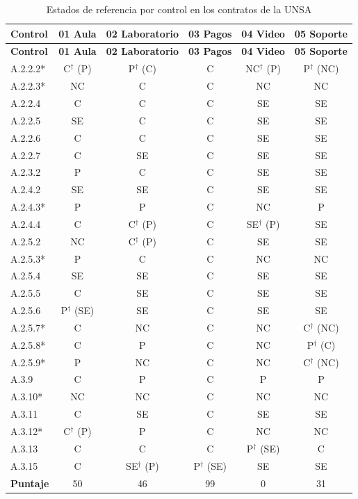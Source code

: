 \documentclass[12pt,letterpaper]{article}
\begin{document}
\begin{small}
\begin{longtable}{@{}l c c c c c@{}}
\caption{Estados de referencia por control en los contratos de la UNSA}\label{tab:unsa-matriz}\\
\toprule
\textbf{Control} & \textbf{01 Aula} & \textbf{02 Laboratorio} & \textbf{03 Pagos} & \textbf{04 Video} & \textbf{05 Soporte} \\
\midrule
\endfirsthead
\toprule
\textbf{Control} & \textbf{01 Aula} & \textbf{02 Laboratorio} & \textbf{03 Pagos} & \textbf{04 Video} & \textbf{05 Soporte} \\
\midrule
\endhead
\bottomrule
\endfoot
A.2.2.2* & C$^\dagger$ (P) & P$^\dagger$ (C) & C & NC$^\dagger$ (P) & P$^\dagger$ (NC) \\
A.2.2.3* & NC & C & C & NC & NC \\
A.2.2.4 & C & C & C & SE & SE \\
A.2.2.5 & SE & C & C & SE & SE \\
A.2.2.6 & C & C & C & SE & SE \\
A.2.2.7 & C & SE & C & SE & SE \\
A.2.3.2 & P & C & C & SE & SE \\
A.2.4.2 & SE & SE & C & SE & SE \\
A.2.4.3* & P & P & C & NC & P \\
A.2.4.4 & C & C$^\dagger$ (P) & C & SE$^\dagger$ (P) & SE \\
A.2.5.2 & NC & C$^\dagger$ (P) & C & SE & SE \\
A.2.5.3* & P & C & C & NC & NC \\
A.2.5.4 & SE & SE & C & SE & SE \\
A.2.5.5 & C & SE & C & SE & SE \\
A.2.5.6 & P$^\dagger$ (SE) & SE & C & SE & SE \\
A.2.5.7* & C & NC & C & NC & C$^\dagger$ (NC) \\
A.2.5.8* & C & P & C & NC & P$^\dagger$ (C) \\
A.2.5.9* & P & NC & C & NC & C$^\dagger$ (NC) \\
A.3.9 & C & P & C & P & P \\
A.3.10* & NC & NC & C & NC & NC \\
A.3.11 & C & SE & C & SE & SE \\
A.3.12* & C$^\dagger$ (P) & P & C & NC & NC \\
A.3.13 & C & C & C & P$^\dagger$ (SE) & C \\
A.3.15 & C & SE$^\dagger$ (P) & P$^\dagger$ (SE) & SE & SE \\
\midrule
\textbf{Puntaje} & 50 & 46 & 99 & 0 & 31 \\
\end{longtable}
\end{small}
\end{document}
